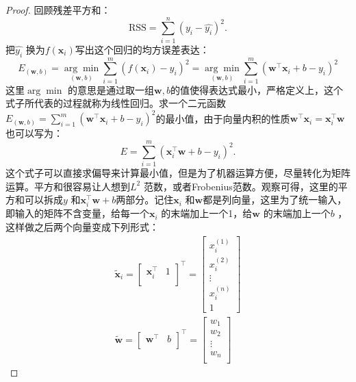\begin{proof}
    回顾残差平方和：\[
        \text{RSS} = \sum_{i=1}^{n} \left( y_{i}-\hat{y_{i}} \right)^2 
    .\]
    把$\hat{y_{i}}$ 换为$f\left( \bm{x}_i \right)$写出这个回归的均方误差表达：\begin{equation}
        \label{eq:RSS-f(x)}
    E_{\left( \bm{w}, b \right)} = \underset{\left( \bm{w},b \right)}{\arg \min } \sum_{i=1}^{m} \left( f\left( \bm{x}_i \right)-y_{i}  \right)^2 = \underset{(\bm{w},b)}{\arg\min} \sum_{i=1}^{m} \left( \bm{w}^\top \bm{x}_i+b-y_{i} \right)^2 
    \end{equation}
    这里$\arg \min $ 的意思是通过取一组$\bm{w},b$的值使得表达式最小，严格定义上，这个式子所代表的过程就称为线性回归。求一个二元函数$E_{\left( \bm{w},b \right)}=\sum_{i=1}^{m} \left( \bm{w}^\top \bm{x}_i+b-y_{i} \right)^2 $的最小值，由于向量内积的性质$\bm{w}^\top \bm{x}_i=\bm{x}_i^\top \bm{w}$也可以写为：\[
        E = \sum_{i=1}^{m} \left( \bm{x}_i^\top \bm{w} +b-y_{i}\right)^2 
    .\]
    这个式子可以直接求偏导来计算最小值，但是为了机器运算方便，尽量转化为矩阵运算。平方和很容易让人想到$L^2 $ 范数，或者Frobenius范数。观察可得，这里的平方和可以拆成$y$ 和$\bm{x}_i^\top \bm{w}+b$两部分。记住$\bm{x}_i$ 和$\bm{w}$都是列向量，这里为了统一输入，即输入的矩阵不含变量，给每一个$\bm{x}_i$ 的末端加上一个1，给$\bm{w}$ 的末端加上一个$b$ ，这样做之后两个向量变成下列形式：
    \begin{align*}
        \bm{\widetilde{x}}_i = \begin{bmatrix}
            \bm{x}_i^\top & 1\\
        \end{bmatrix}^\top =\begin{bmatrix}
            x_{i}^{(1)}\\
            x_{i}^{(2)}\\
            \vdots\\
            x_{i}^{(n)}\\
            1
        \end{bmatrix}\\
        \bm{\widetilde{w}} = \begin{bmatrix}
            \bm{w}^\top & b\\
        \end{bmatrix}^\top  = \begin{bmatrix}
            w_1\\
            w_2\\
            \vdots\\
            w_{n}\\

\end{bmatrix}
\end{align*}
\end{proof}
